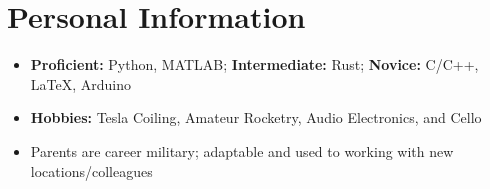 \documentclass[11pt]{moderncv}
\begin{document}
\section{Personal Information}
\begin{itemize}
\item \textbf{Proficient:} Python, MATLAB; \textbf{Intermediate:} Rust; \textbf{Novice:} C/C++, \LaTeX, Arduino
\item \textbf{Hobbies:} Tesla Coiling, Amateur Rocketry, Audio Electronics, and Cello
\item Parents are career military; adaptable and used to working with new locations/colleagues
\end{itemize}
\end{document}
